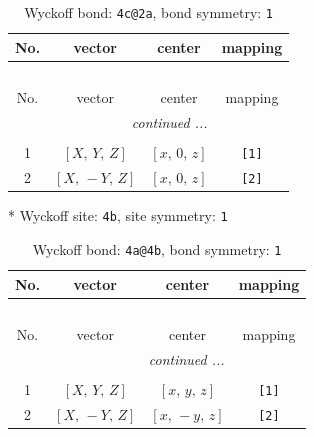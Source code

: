 \documentclass[fleqn,8pt]{jsarticle}
\begin{document}
\renewcommand{\arraystretch}{1.2}
\begin{longtable}{cccc}
\caption{Wyckoff bond: {\tt 4c@2a}, bond symmetry: {\tt 1}}
 \\
 \hline \hline
No. & vector & center & mapping \\ \hline \endfirsthead

\multicolumn{3}{l}{\tablename\ \thetable{}} \\
 \hline \hline
No. & vector & center & mapping \\ \hline \endhead

 \hline \hline
\multicolumn{3}{r}{\footnotesize\it continued ...} \\ \endfoot

 \hline \hline
\multicolumn{3}{r}{} \\ \endlastfoot

1 & $\left[ X,\, Y,\, Z \right]$ & $\left[ x,\, 0,\, z \right]$ & {\tt [1]} \\ \hline
2 & $\left[ X,\, - Y,\, Z \right]$ & $\left[ x,\, 0,\, z \right]$ & {\tt [2]} \\
\end{longtable}
* Wyckoff site: {\tt 4b}, site symmetry: {\tt 1}
\renewcommand{\arraystretch}{1.2}
\begin{longtable}{cccc}
\caption{Wyckoff bond: {\tt 4a@4b}, bond symmetry: {\tt 1}}
 \\
 \hline \hline
No. & vector & center & mapping \\ \hline \endfirsthead

\multicolumn{3}{l}{\tablename\ \thetable{}} \\
 \hline \hline
No. & vector & center & mapping \\ \hline \endhead

 \hline \hline
\multicolumn{3}{r}{\footnotesize\it continued ...} \\ \endfoot

 \hline \hline
\multicolumn{3}{r}{} \\ \endlastfoot

1 & $\left[ X,\, Y,\, Z \right]$ & $\left[ x,\, y,\, z \right]$ & {\tt [1]} \\ \hline
2 & $\left[ X,\, - Y,\, Z \right]$ & $\left[ x,\, - y,\, z \right]$ & {\tt [2]} \\
\end{longtable}
\end{document}
